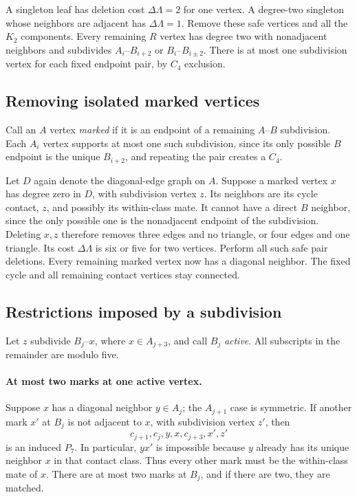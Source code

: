 \documentclass[11pt,a4paper]{article}
\theoremstyle{definition}\newtheorem{definition}[theorem]{Definition}
\theoremstyle{remark}\newtheorem{remark}[theorem]{Remark}
\begin{document}
A singleton leaf has deletion cost $\Delta \Lambda=2$ for one vertex. A
degree-two singleton whose neighbors are adjacent has $\Delta \Lambda=1$.
Remove these safe vertices and all the $K_2$ components. Every remaining
$R$ vertex has degree two with nonadjacent neighbors and subdivides
$A_i$--$B_{i+2}$ or $B_i$--$B_{i\pm2}$. There is at most one subdivision
vertex for each fixed endpoint pair, by $C_4$ exclusion.

\subsection{Removing isolated marked vertices}
Call an $A$ vertex \emph{marked} if it is an endpoint of a remaining
$A$--$B$ subdivision. Each $A_i$ vertex supports at most one such
subdivision, since its only possible $B$ endpoint is the unique $B_{i+2}$,
and repeating the pair creates a $C_4$.

Let $D$ again denote the diagonal-edge graph on $A$. Suppose a marked
vertex $x$ has degree zero in $D$, with subdivision vertex $z$. Its
neighbors are its cycle contact, $z$, and possibly its within-class mate.
It cannot have a direct $B$ neighbor, since the only possible one is the
nonadjacent endpoint of the subdivision. Deleting $x,z$ therefore removes
three edges and no triangle, or four edges and one triangle. Its cost
$\Delta \Lambda$ is six or five for two vertices. Perform all such safe pair
deletions. Every remaining marked vertex now has a diagonal neighbor.
The fixed cycle and all remaining contact vertices stay connected.

\subsection{Restrictions imposed by a subdivision}
Let $z$ subdivide $B_j$--$x$, where $x\in A_{j+3}$, and call $B_j$
\emph{active}. All subscripts in the remainder are modulo five.

\paragraph{At most two marks at one active vertex.}
Suppose $x$ has a diagonal neighbor $y\in A_j$; the $A_{j+1}$ case is
symmetric. If another mark $x'$ at $B_j$ is not adjacent to $x$, with
subdivision vertex $z'$, then
\[
 c_{j+1},c_j,y,x,c_{j+3},x',z'
\]
is an induced $P_7$. In particular, $yx'$ is impossible because $y$
already has its unique neighbor $x$ in that contact class. Thus every
other mark must be the within-class mate of $x$. There are at most two
marks at $B_j$, and if there are two, they are matched.
\end{document}
